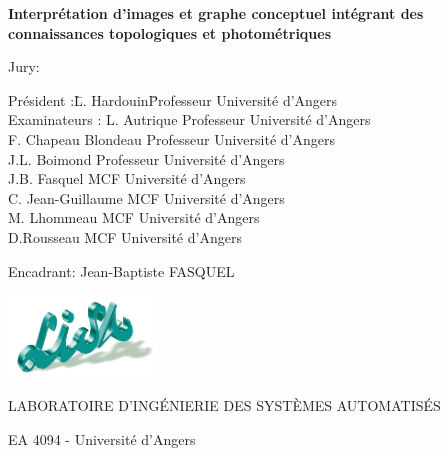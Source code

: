 {{\begin{center}
	\begin{Large}
		\bf{Interprétation d'images et graphe conceptuel intégrant des connaissances topologiques et photométriques}
		\bigskip\bigskip\bigskip
	\end{Large}
	
	\begin{normalsize}
		Jury:\\
	\end{normalsize}
	\parbox{15cm}{
		\begin{tabbing}
			Président :\hspace{4em}\= L. Hardouin\hspace{5em}\= Professeur Université d'Angers\\
			Examinateurs :   	\> L. Autrique	\> Professeur Université d'Angers\\
				\> F. Chapeau Blondeau	\> Professeur Université d'Angers\\
				\> J.L. Boimond			\> Professeur Université d'Angers\\
				\> J.B. Fasquel  		\> MCF Université d'Angers\\
				\> C. Jean-Guillaume	\> MCF Université d'Angers\\
				\> M. Lhommeau			\> MCF Université d'Angers\\
				\> D.Rousseau			\> MCF Université d'Angers
		
		\end{tabbing}
	}
	\bigskip\bigskip\bigskip
\end{center}
	\begin{large}
		Encadrant: Jean-Baptiste FASQUEL		
	\end{large}
	\begin{flushright}
	\parbox{15cm}{
		\begin{flushright}

		\includegraphics[width=4cm]{figure/logo_lisa.png}

		LABORATOIRE D’INGÉNIERIE DES SYSTÈMES AUTOMATISÉS 

		EA 4094 - Université d’Angers
		\end{flushright}}
		\end{flushright}
		\clearpage
	}
}

